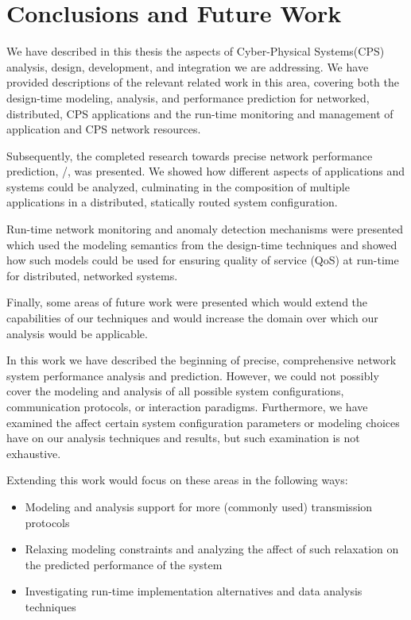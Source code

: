 \chapter{Conclusions and Future Work}
\label{ch:conclusions}

We have described in this thesis the aspects of Cyber-Physical
Systems(CPS) analysis, design, development, and integration we are
addressing.  We have provided descriptions of the relevant related
work in this area, covering both the design-time modeling, analysis,
and performance prediction for networked, distributed, CPS
applications and the run-time monitoring and management of application
and CPS network resources.

Subsequently, the completed research towards precise network
performance prediction, \shorttool/, was presented.  We showed how
different aspects of applications and systems could be analyzed,
culminating in the composition of multiple applications in a
distributed, statically routed system configuration.

Run-time network monitoring and anomaly detection mechanisms were
presented which used the modeling semantics from the design-time
techniques and showed how such models could be used for ensuring
quality of service (QoS) at run-time for distributed, networked
systems.

Finally, some areas of future work were presented which would extend
the capabilities of our techniques and would increase the domain over
which our analysis would be applicable.

In this work we have described the beginning of precise, comprehensive
network system performance analysis and prediction.  However, we could
not possibly cover the modeling and analysis of all possible system
configurations, communication protocols, or interaction paradigms.
Furthermore, we have examined the affect certain system configuration
parameters or modeling choices have on our analysis techniques and
results, but such examination is not exhaustive.

Extending this work would focus on these areas in the following ways:

\begin{itemize}
  \item Modeling and analysis support for more (commonly used)
    transmission protocols
  \item Relaxing modeling constraints and analyzing the affect of such
    relaxation on the predicted performance of the system
  \item Investigating run-time implementation alternatives and data
    analysis techniques
\end{itemize}

